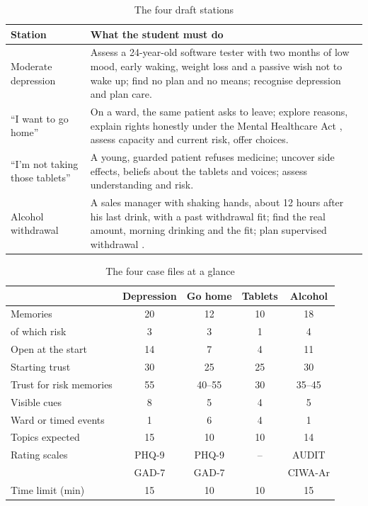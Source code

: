 \documentclass[journal]{IEEEtran}
\begin{document}
\begin{table}[t]
\caption{The four draft stations}
\label{p4:tab:stations}
\centering
\scriptsize
\begin{tabularx}{\columnwidth}{@{}lY@{}}
\toprule
Station & What the student must do\\
\midrule
Moderate depression & Assess a 24-year-old software tester with two months of low mood, early waking, weight loss and a passive wish not to wake up; find no
plan and no means; recognise depression and plan care.\\
``I want to go home'' & On a ward, the same patient asks to leave; explore reasons, explain rights honestly under the Mental Healthcare Act
\cite{mhca2017}, assess capacity and current risk, offer choices.\\
``I'm not taking those tablets'' & A young, guarded patient refuses medicine; uncover side effects, beliefs about the tablets and voices; assess
understanding and risk.\\
Alcohol withdrawal & A sales manager with shaking hands, about 12 hours after his last drink, with a past withdrawal fit; find the real amount, morning
drinking and the fit; plan supervised withdrawal \cite{nice2010cg100}.\\
\bottomrule
\end{tabularx}
\end{table}

\begin{table}[t]
\caption{The four case files at a glance}
\label{p4:tab:casestats}
\centering
\scriptsize
\setlength{\tabcolsep}{2.5pt}
\begin{tabular}{@{}lcccc@{}}
\toprule
& Depression & Go home & Tablets & Alcohol\\
\midrule
Memories & 20 & 12 & 10 & 18\\
\quad of which risk & 3 & 3 & 1 & 4\\
Open at the start & 14 & 7 & 4 & 11\\
Starting trust & 30 & 25 & 25 & 30\\
Trust for risk memories & 55 & 40--55 & 30 & 35--45\\
Visible cues & 8 & 5 & 4 & 5\\
Ward or timed events & 1 & 6 & 4 & 1\\
Topics expected & 15 & 10 & 10 & 14\\
Rating scales & PHQ-9 & PHQ-9 & -- & AUDIT\\
& GAD-7 & GAD-7 & & CIWA-Ar\\
Time limit (min) & 15 & 10 & 10 & 15\\
\bottomrule
\end{tabular}
\end{table}
\end{document}
